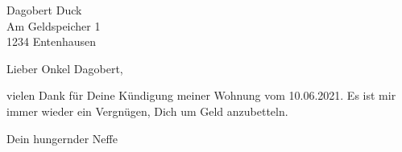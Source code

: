 \documentclass[12pt,ngerman]{scrlttr2}
\date{Entenhausen, den \today}
\begin{document}
\begin{letter}{Dagobert Duck \\ Am Geldspeicher 1 \\ 1234 Entenhausen}
\opening{Lieber Onkel Dagobert,}

vielen Dank  für Deine Kündigung meiner Wohnung vom 10.06.2021. Es ist mir immer wieder ein Vergnügen, Dich um Geld anzubetteln.

\blindtext[5]

\closing{Dein hungernder Neffe}
\end{letter}
\end{document}
